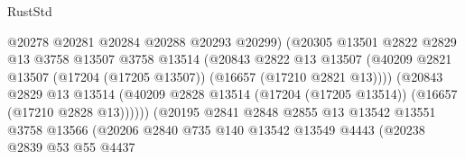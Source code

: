 \begin{lexlean}{RustStd}
\begin{coremodule}
                                        @20278
                                        @20281
                                        @20284
                                        @20288
                                        @20293
                                        @20299)
                                      (@20305
                                        @13501
                                        @2822
                                        @2829
                                        @13
                                        @3758
                                        @13507
                                        @3758
                                        @13514
                                        (@20843
                                          @2822
                                          @13
                                          @13507
                                          (@40209
                                            @2821
                                            @13507
                                            (@17204 (@17205 @13507))
                                            (@16657 (@17210 @2821 @13))))
                                        (@20843
                                          @2829
                                          @13
                                          @13514
                                          (@40209
                                            @2828
                                            @13514
                                            (@17204 (@17205 @13514))
                                            (@16657 (@17210 @2828 @13))))))
                                    (@20195
                                      @2841
                                      @2848
                                      @2855
                                      @13
                                      @13542
                                      @13551
                                      @3758
                                      @13566
                                      (@20206
                                        @2840
                                        @735
                                        @140
                                        @13542
                                        @13549
                                        @4443
                                        (@20238
                                          @2839
                                          @53
                                          @55
                                          @4437

\end{coremodule}
\end{lexlean}
